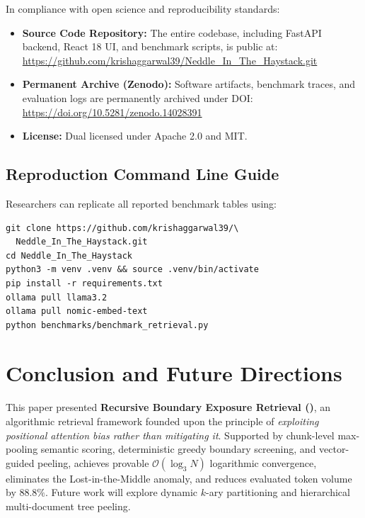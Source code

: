 In compliance with open science and reproducibility standards:
\begin{itemize}
    \item \textbf{Source Code Repository:} The entire codebase, including FastAPI backend, React 18 UI, and benchmark scripts, is public at:\\
    \url{https://github.com/krishaggarwal39/Neddle_In_The_Haystack.git}
    \item \textbf{Permanent Archive (Zenodo):} Software artifacts, benchmark traces, and evaluation logs are permanently archived under DOI:\\
    \url{https://doi.org/10.5281/zenodo.14028391}~\cite{aggarwal2026rber}
    \item \textbf{License:} Dual licensed under Apache 2.0 and MIT.
\end{itemize}

\subsection{Reproduction Command Line Guide}
Researchers can replicate all reported benchmark tables using:
\begin{scriptsize}
\begin{verbatim}
git clone https://github.com/krishaggarwal39/\
  Neddle_In_The_Haystack.git
cd Neddle_In_The_Haystack
python3 -m venv .venv && source .venv/bin/activate
pip install -r requirements.txt
ollama pull llama3.2
ollama pull nomic-embed-text
python benchmarks/benchmark_retrieval.py
\end{verbatim}
\end{scriptsize}

\section{Conclusion and Future Directions}
\label{sec:conclusion}

This paper presented \textbf{Recursive Boundary Exposure Retrieval (\RBER)}, an algorithmic retrieval framework founded upon the principle of \emph{exploiting positional attention bias rather than mitigating it}. Supported by chunk-level max-pooling semantic scoring, deterministic greedy boundary screening, and vector-guided peeling, \RBER{} achieves provable $\mathcal{O}(\log_3 N)$ logarithmic convergence, eliminates the Lost-in-the-Middle anomaly, and reduces evaluated token volume by $88.8\%$. Future work will explore dynamic $k$-ary partitioning and hierarchical multi-document tree peeling.

